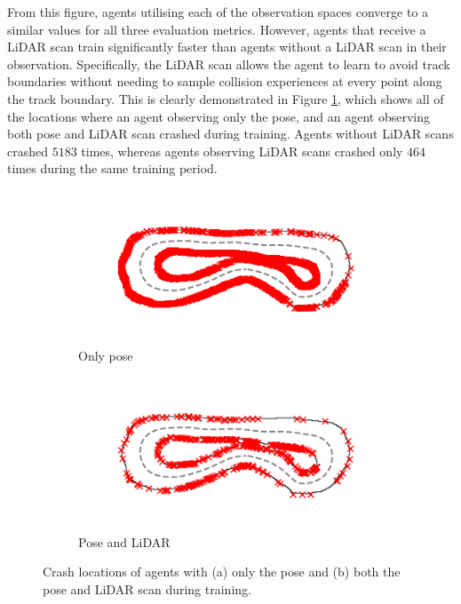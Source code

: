 From this figure, agents utilising each of the observation spaces converge to a similar values for all three evaluation metrics.
However, agents that receive a LiDAR scan train significantly faster than agents without a LiDAR scan in their observation.
Specifically, the LiDAR scan allows the agent to learn to avoid track boundaries without needing to sample collision experiences at every point along the track boundary.
This is clearly demonstrated in Figure \ref{fig:collision_distribution}, which shows all of the locations where an agent observing only the pose, and an agent observing both pose and LiDAR scan crashed during training.
Agents without LiDAR scans crashed $5183$ times, whereas agents observing LiDAR scans crashed only $464$ times during the same training period.

\begin{figure}[htb!]
    \centering
    \begin{subfigure}[htb!]{0.45\textwidth}
        \centering
        \includegraphics[height=.56\linewidth]{contents/chapt5/figs/observation/collision_distributions/crash_location_pose.png}
        \caption{Only pose}
    \end{subfigure}
    \hfill
    \begin{subfigure}[htb!]{0.45\textwidth}
        \centering
        \includegraphics[height=.56\linewidth]{contents/chapt5/figs/observation/collision_distributions/crash_location_both.png}
        \caption{Pose and LiDAR}
    \end{subfigure}
    \hfill
\caption[Locations of crashes during training]{Crash locations of agents with (a) only the pose and (b) both the pose and LiDAR scan during training.}
\label{fig:collision_distribution}
\end{figure}

